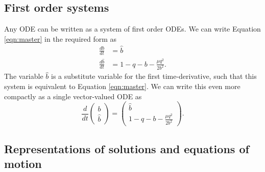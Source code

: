 
\subsection{First order systems}


Any ODE can be written as a system of first order ODEs.
We can write Equation \ref{eqn:master} in the required form as
\begin{equation}
	\begin{aligned}
		\frac{db}{dt}       & = \hat{b}                         \\
		\frac{d\hat{b}}{dt} & = 1 - q - b - \frac{\mu q^2}{2b^2}.
	\end{aligned}
	\label{eqn:first_order_system}
\end{equation}
The variable $\hat{b}$ is a substitute variable for the first time-derivative,
such that this system is equivalent to Equation \ref{eqn:master}.
We can write this even more compactly as a single vector-valued ODE as
\begin{equation}
	\frac{d}{dt}\begin{pmatrix}
		b \\
		\hat{b}
	\end{pmatrix} = \begin{pmatrix}
		\hat{b} \\
		1 - q - b - \frac{\mu q^2}{2b^2}
	\end{pmatrix}.
	\label{eqn:vector_system}
\end{equation}

\subsection{Representations of solutions and equations of motion}

